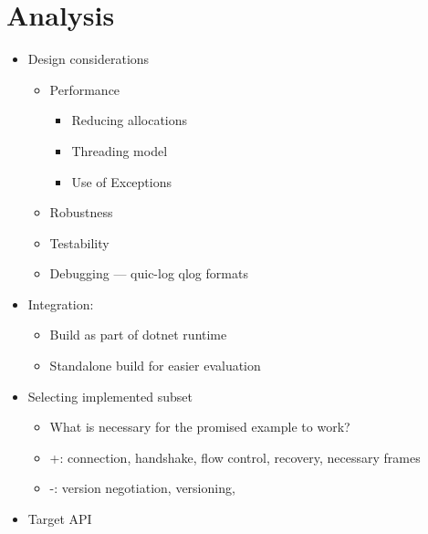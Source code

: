 \chapter{Analysis}
\begin{itemize}

    \item Design considerations
    \begin{itemize}

        \item Performance
        \begin{itemize}

            \item Reducing allocations
            \item Threading model
            \item Use of Exceptions

        \end{itemize}

        \item Robustness

        \item Testability

        \item Debugging --- quic-log qlog formats

    \end{itemize}

    \item Integration:
    \begin{itemize}

        \item Build as part of dotnet runtime
        \item Standalone build for easier evaluation

    \end{itemize}

    \item Selecting implemented subset
    \begin{itemize}

        \item What is necessary for the promised example to work?
        \item +: connection, handshake, flow control, recovery, necessary frames
        \item -: version negotiation, versioning,

    \end{itemize}

    \item Target API
    \begin{itemize}


\end{itemize}
\end{itemize}
